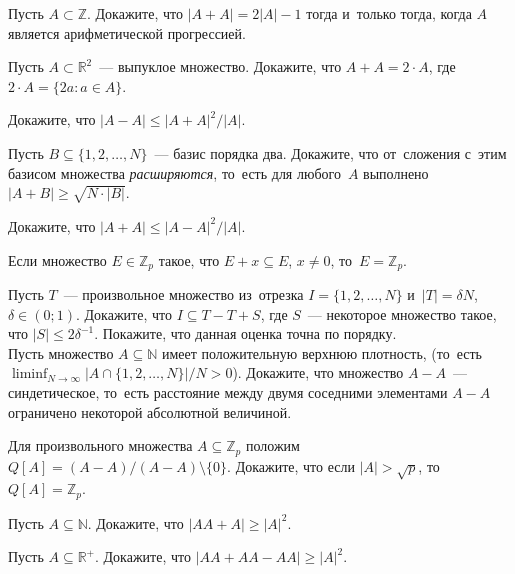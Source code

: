\begin{problems}

\item
Пусть $A \subset \mathbb{Z}$.
Докажите, что $|A + A| = 2 |A| - 1$ тогда и~только тогда, когда $A$ является
арифметической прогрессией.

\item
Пусть $A \subset \mathbb{R}^2$~--- выпуклое множество.
Докажите, что $A + A = 2 \cdot A$, где $2 \cdot A = \{ 2a \colon a \in A \}$.

\item
Докажите, что $|A - A| \leq |A + A|^2 / |A|$.

\item
Пусть $B \subseteq \{ 1, 2, \ldots, N \}$~--- базис порядка два.
Докажите, что от~сложения с~этим базисом множества \emph{расширяются},
то~есть для любого~$A$ выполнено $|A + B| \geq \sqrt{N \cdot | B |}$.

\item
Докажите, что $|A + A| \leq |A - A|^2 / |A|$.

\item
Если множество $E \in \mathbb{Z}_p$ такое, что $E + x \subseteq E$, $x \neq 0$,
то~$E = \mathbb{Z}_p$.

\item
\sp
Пусть $T$~--- произвольное множество из~отрезка $I = \{ 1, 2, \ldots, N \}$
и~$|T| = \delta N$, $\delta \in (0; 1)$.
Докажите, что $I \subseteq T - T + S$, где $S$~--- некоторое множество такое,
что $|S| \leq 2 \delta^{-1}$.
Покажите, что данная оценка точна по порядку.
\\
\sp
Пусть множество $A \subseteq \mathbb{N}$ имеет положительную верхнюю плотность,
(то~есть
\(
    \liminf_{N \to \infty}
        \bigl| A \cap \{ 1, 2, \ldots, N \} \bigr| / N
>
    0
\)).
Докажите, что множество $A - A$~--- синдетическое, то~есть расстояние между
двумя соседними элементами $A - A$ ограничено некоторой абсолютной величиной.

\item
Для произвольного множества $A \subseteq \mathbb{Z}_p$ положим
\(
    Q[A] = (A - A) / (A - A) \setminus \{ 0 \}
\).
Докажите, что если $|A| > \sqrt{p}$, то~$Q[A] = \mathbb{Z}_p$.

\item
Пусть $A \subseteq \mathbb{N}$.
Докажите, что $|A A + A| \geq |A|^2$.

\item
Пусть $A \subseteq \mathbb{R}^{+}$.
Докажите, что $|A A + A A - A A| \geq |A|^2$.

\end{problems}


